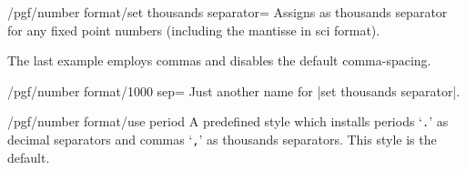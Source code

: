 \begin{key}{/pgf/number format/set thousands separator=}
Assigns  as thousands separator for any fixed point numbers (including the mantisse in sci format).

\begin{codeexample}[]
\end{codeexample}
\begin{codeexample}[]
\end{codeexample}

\begin{codeexample}[]
\end{codeexample}
\begin{codeexample}[]
\end{codeexample}
\begin{codeexample}[]
\end{codeexample}
The last example employs commas and disables the default comma-spacing. 
\end{key}
\begin{key}{/pgf/number format/1000 sep=}
	Just another name for |set thousands separator|.
\end{key}


\begin{key}{/pgf/number format/use period}
A predefined style which installs periods `\texttt{.}' as decimal separators and commas `\texttt{,}' as thousands separators. This style is the default.

\begin{codeexample}[]
\end{codeexample}
\begin{codeexample}[]
\end{codeexample}
\end{key}

